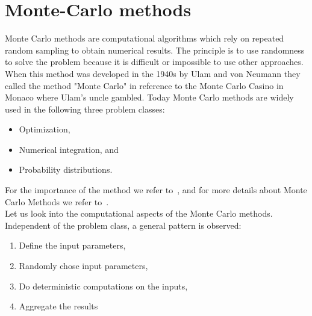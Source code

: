 \chapter{Monte-Carlo methods}
\label{sec:monte:carlo}
Monte Carlo methods are computational algorithms which rely on repeated random sampling to obtain numerical results. The principle is to use randomness to solve the problem because it is difficult or impossible to use other approaches. When this method was developed in the 1940s by Ulam and von Neumann they called the method "Monte Carlo" in reference to the Monte Carlo Casino in Monaco where Ulam's uncle gambled. Today Monte Carlo methods are widely used in the following three problem classes:
\begin{itemize}
\item Optimization,
\item Numerical integration, and
\item Probability distributions.
\end{itemize}
For the importance of the method we refer to~\cite{kroese2014monte}, and for more details about Monte Carlo Methods we refer to~\cite{shonkwiler2009explorations}.\\

Let us look into the computational aspects of the Monte Carlo methods. Independent of the problem class, a general pattern is observed:
\begin{enumerate}
\item Define the input parameters,
\item Randomly chose input parameters,
\item Do deterministic computations on the inputs,
\item Aggregate the results
\end{enumerate}

